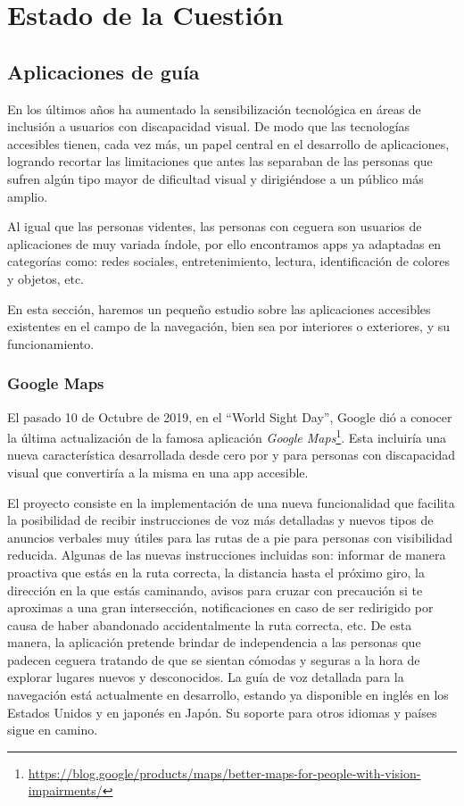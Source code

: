\chapter{Estado de la Cuestión}
\label{cap:estadoDeLaCuestion}

\section{Aplicaciones de guía}
En los últimos años ha aumentado la sensibilización tecnológica en áreas de inclusión a usuarios con discapacidad visual. De modo que las tecnologías accesibles tienen, cada vez más, un papel central en el desarrollo de aplicaciones, logrando recortar las limitaciones que antes las separaban de las personas que sufren algún tipo mayor de dificultad visual y dirigiéndose a un público más amplio.

Al igual que las personas videntes, las personas con ceguera son usuarios de aplicaciones de muy variada índole, por ello encontramos apps ya adaptadas en categorías como: redes sociales, entretenimiento, lectura, identificación de colores y objetos, etc. 

En esta sección, haremos un pequeño estudio sobre las aplicaciones accesibles existentes en el campo de la navegación, bien sea por interiores o exteriores, y su funcionamiento.
\subsection{Google Maps}
El pasado 10 de Octubre de 2019, en el ``World Sight Day'', Google dió a conocer la última actualización de la famosa aplicación \textit{Google Maps}\footnote{\url{https://blog.google/products/maps/better-maps-for-people-with-vision-impairments/}}. Esta incluiría una nueva característica desarrollada desde cero por y para personas con discapacidad visual que convertiría a la misma en una app accesible.

El proyecto consiste en la implementación de una nueva funcionalidad que facilita la posibilidad de recibir instrucciones de voz más detalladas y nuevos tipos de anuncios verbales muy útiles para las rutas de a pie para personas con visibilidad reducida. Algunas de las nuevas instrucciones incluidas son: informar de manera proactiva que estás en la ruta correcta, la distancia hasta el próximo giro, la dirección en la que estás caminando, avisos para cruzar con precaución si te aproximas a una gran intersección, notificaciones en caso de ser redirigido por causa de haber abandonado accidentalmente la ruta correcta, etc. De esta manera, la aplicación pretende brindar de independencia a las personas que padecen ceguera tratando de que se sientan cómodas y seguras a la hora de explorar lugares nuevos y desconocidos. La guía de voz detallada para la navegación está actualmente en desarrollo, estando ya disponible en inglés en los Estados Unidos y en japonés en Japón. Su soporte para otros idiomas y países sigue en camino.

